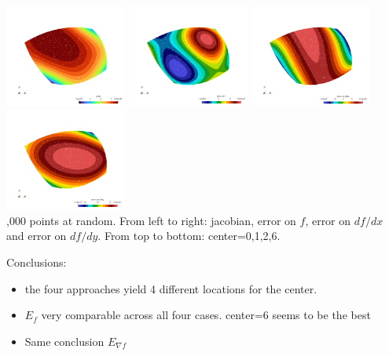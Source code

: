 \begin{center}
\includegraphics[width=4cm]{images/mappings/biquadratic3/elt3/jcob.0003.png}
\includegraphics[width=4cm]{images/mappings/biquadratic3/elt3/f.0003.png}
\includegraphics[width=4cm]{images/mappings/biquadratic3/elt3/dfdx.0003.png}
\includegraphics[width=4cm]{images/mappings/biquadratic3/elt3/dfdy.0003.png}\\
{,000 points at random. From left to right: jacobian, 
error on $f$, error on $df/dx$ and error on $df/dy$. From top
to bottom: center=0,1,2,6.} 
\end{center}


Conclusions:
\begin{itemize}
\item the four approaches yield 4 different locations for the center.
\item $E_f$ very comparable across all four cases. center=6 seems to be the best
\item Same conclusion $E_{\nabla f}$ 
\end{itemize} 

